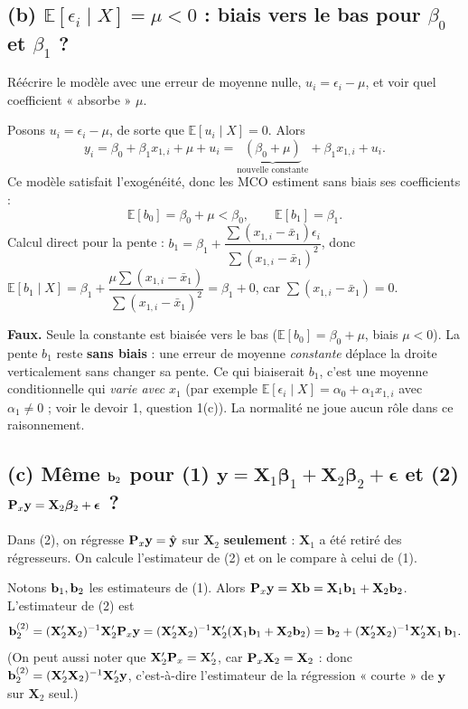 \documentclass[11pt,a4paper]{article}
\newcommand{\vy}{\mathbf{y}}\newcommand{\vX}{\mathbf{X}}\newcommand{\vZ}{\mathbf{Z}}
\newcommand{\vbeta}{\bm{\beta}}\newcommand{\veps}{\bm{\epsilon}}\newcommand{\vi}{\bm{\iota}}
\newcommand{\E}{\mathbb{E}}\newcommand{\Var}{\operatorname{Var}}\newcommand{\Cov}{\operatorname{Cov}}
\begin{document}
\subsection*{(b) $\E[\epsilon_i\mid X]=\mu<0$ : biais vers le bas pour $\beta_0$ et $\beta_1$ ?}

\begin{idee}
Réécrire le modèle avec une erreur de moyenne nulle, $u_i=\epsilon_i-\mu$, et voir quel coefficient « absorbe » $\mu$.
\end{idee}

Posons $u_i=\epsilon_i-\mu$, de sorte que $\E[u_i\mid X]=0$. Alors
\[
y_i=\beta_0+\beta_1x_{1,i}+\mu+u_i=\underbrace{(\beta_0+\mu)}_{\text{nouvelle constante}}+\beta_1x_{1,i}+u_i .
\]
Ce modèle satisfait l'exogénéité, donc les MCO estiment sans biais ses coefficients :
\[
\E[b_0]=\beta_0+\mu<\beta_0,\qquad \E[b_1]=\beta_1 .
\]
Calcul direct pour la pente : $b_1=\beta_1+\dfrac{\sum(x_{1,i}-\bar x_1)\epsilon_i}{\sum(x_{1,i}-\bar x_1)^2}$, donc
$\E[b_1\mid X]=\beta_1+\dfrac{\mu\sum(x_{1,i}-\bar x_1)}{\sum(x_{1,i}-\bar x_1)^2}=\beta_1+0$, car $\sum(x_{1,i}-\bar x_1)=0$.

\begin{reponse}
\textbf{Faux.} Seule la constante est biaisée vers le bas ($\E[b_0]=\beta_0+\mu$, biais $\mu<0$). La pente $b_1$ reste \textbf{sans biais} : une erreur de moyenne \emph{constante} déplace la droite verticalement sans changer sa pente. Ce qui biaiserait $b_1$, c'est une moyenne conditionnelle qui \emph{varie avec} $x_1$ (par exemple $\E[\epsilon_i\mid X]=\alpha_0+\alpha_1x_{1,i}$ avec $\alpha_1\ne0$ ; voir le devoir 1, question 1(c)). La normalité ne joue aucun rôle dans ce raisonnement.
\end{reponse}

\subsection*{(c) Même $\mathbf{b}_2$ pour (1) $\vy=\vX_1\vbeta_1+\vX_2\vbeta_2+\veps$ et (2) $\Pm_x\vy=\vX_2\vbeta_2+\veps$ ?}

\begin{idee}
Dans (2), on régresse $\Pm_x\vy=\hat{\vy}$ sur $\vX_2$ \textbf{seulement} : $\vX_1$ a été retiré des régresseurs. On calcule l'estimateur de (2) et on le compare à celui de (1).
\end{idee}

Notons $\mathbf{b}_1,\mathbf{b}_2$ les estimateurs de (1). Alors $\Pm_x\vy=\vX\vb=\vX_1\vb_1+\vX_2\vb_2$. L'estimateur de (2) est
\[
\vb_2^{(2)}=(\vX_2'\vX_2)^{-1}\vX_2'\Pm_x\vy=(\vX_2'\vX_2)^{-1}\vX_2'(\vX_1\vb_1+\vX_2\vb_2)
=\vb_2+(\vX_2'\vX_2)^{-1}\vX_2'\vX_1\,\vb_1 .
\]
(On peut aussi noter que $\vX_2'\Pm_x=\vX_2'$, car $\Pm_x\vX_2=\vX_2$ : donc $\vb_2^{(2)}=(\vX_2'\vX_2)^{-1}\vX_2'\vy$, c'est-à-dire l'estimateur de la régression « courte » de $\vy$ sur $\vX_2$ seul.)
\end{document}
